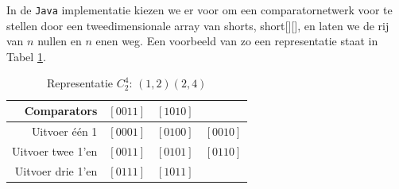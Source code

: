\documentclass{article}
\begin{document}
In de \texttt{Java} implementatie kiezen we er voor om een comparatornetwerk voor te stellen door een tweedimensionale array van shorts, short[][], en laten we de rij van $n$ nullen en $n$ enen  weg.
Een voorbeeld van zo een representatie staat in Tabel \ref{tabel2}.
\begin{table}[!h]
	\centering
	\begin{tabular}{r|ccc}
	Comparators & $\left[0011\right]$ & $\left[1010\right]$ & \\ 
	\hline 
	Uitvoer \'e\'en 1& $\left[0001\right]$ & $\left[0100\right]$ & $\left[0010\right]$ \\ 
	\hline 
	Uitvoer twee 1'en &$\left[0011\right]$ & $\left[0101\right]$ & $\left[0110\right]$\\ 
	\hline 
	Uitvoer drie 1'en & $\left[0111\right]$ & $\left[1011\right]$ &  \\ 
	\end{tabular}
	\caption{Representatie $C^4_2$: $(1,2)(2,4)$}
	\label{tabel2}
\end{table}
\end{document}
